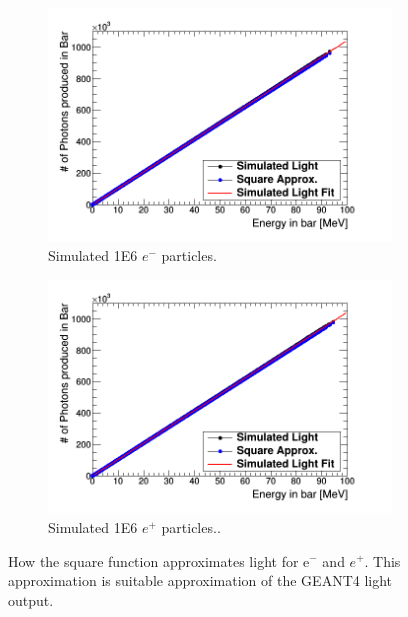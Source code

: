 \begin{figure}[htbp]
\centering
\begin{subfigure}{.5\textwidth}
  \centering
  \includegraphics[width=\linewidth]{Appendix5/Figs/light_of_electronsLin0-100mev.png}
  \captionsetup{width=.9\linewidth}
  \caption{Simulated 1E6 $e^-$ particles.}
  \label{subfig:append5_light_of_electronsLin0-100mev}
\end{subfigure}%
\begin{subfigure}{.5\textwidth}
  \centering
  \includegraphics[width=\linewidth]{Appendix5/Figs/light_of_positronsLin0-100mev.png}
  \captionsetup{width=.9\linewidth}
  \caption{Simulated 1E6 $e^+$ particles..}
  \label{subfig:append5_light_of_positronsLin0-100mev}
\end{subfigure}
\caption{How the square function approximates light for e$^-$ and $e^+$. This approximation is suitable approximation of the GEANT4 light output.}
\label{fig:append5_light_of_electrons_positronsLin0-100mev}
\end{figure}